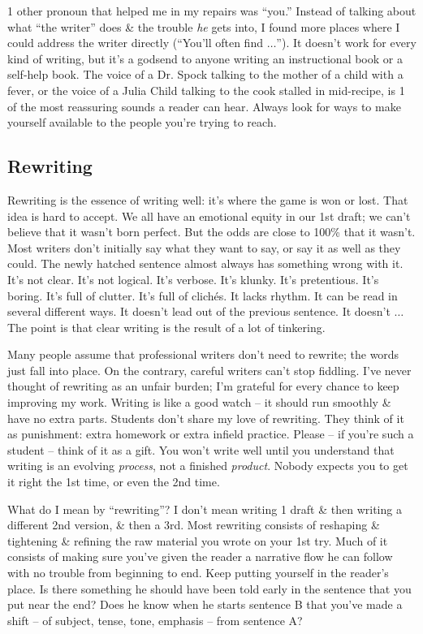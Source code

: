 \documentclass{article}
\begin{document}
1 other pronoun that helped me in my repairs was ``you.'' Instead of talking about what ``the writer'' does \& the trouble \textit{he} gets into, I found more places where I could address the writer directly (``You'll often find $\ldots$''). It doesn't work for every kind of writing, but it's a godsend to anyone writing an instructional book or a self-help book. The voice of a Dr. Spock talking to the mother of a child with a fever, or the voice of a Julia Child talking to the cook stalled in mid-recipe, is 1 of the most reassuring sounds a reader can hear. Always look for ways to make yourself available to the people you're trying to reach.

\subsection{Rewriting}
Rewriting is the essence of writing well: it's where the game is won or lost. That idea is hard to accept. We all have an emotional equity in our 1st draft; we can't believe that it wasn't born perfect. But the odds are close to 100\% that it wasn't. Most writers don't initially say what they want to say, or say it as well as they could. The newly hatched sentence almost always has something wrong with it. It's not clear. It's not logical. It's verbose. It's klunky. It's pretentious. It's boring. It's full of clutter. It's full of clich\'es. It lacks rhythm. It can be read in several different ways. It doesn't lead out of the previous sentence. It doesn't $\ldots$ The point is that clear writing is the result of a lot of tinkering.

Many people assume that professional writers don't need to rewrite; the words just fall into place. On the contrary, careful writers can't stop fiddling. I've never thought of rewriting as an unfair burden; I'm grateful for every chance to keep improving my work. Writing is like a good watch -- it should run smoothly \& have no extra parts. Students don't share my love of rewriting. They think of it as punishment: extra homework or extra infield practice. Please -- if you're such a student -- think of it as a gift. You won't write well until you understand that writing is an evolving \textit{process}, not a finished \textit{product}. Nobody expects you to get it right the 1st time, or even the 2nd time.

What do I mean by ``rewriting''? I don't mean writing 1 draft \& then writing a different 2nd version, \& then a 3rd. Most rewriting consists of reshaping \& tightening \& refining the raw material you wrote on your 1st try. Much of it consists of making sure you've given the reader a narrative flow he can follow with no trouble from beginning to end. Keep putting yourself in the reader's place. Is there something he should have been told early in the sentence that you put near the end? Does he know when he starts sentence B that you've made a shift -- of subject, tense, tone, emphasis -- from sentence A?
\end{document}
